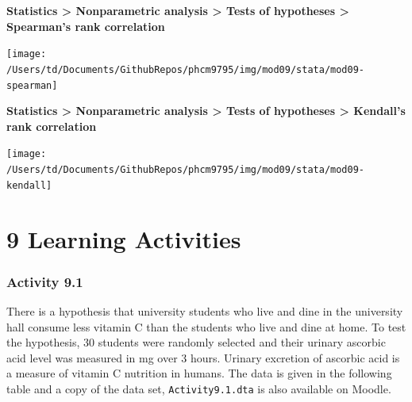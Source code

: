 \documentclass[
]{memoir}
\begin{document}
\textbf{Statistics \textgreater{} Nonparametric analysis \textgreater{} Tests of hypotheses \textgreater{} Spearman's rank correlation}

\texttt{[image: /Users/td/Documents/GithubRepos/phcm9795/img/mod09/stata/mod09-spearman]}

\textbf{Statistics \textgreater{} Nonparametric analysis \textgreater{} Tests of hypotheses \textgreater{} Kendall's rank correlation}

\texttt{[image: /Users/td/Documents/GithubRepos/phcm9795/img/mod09/stata/mod09-kendall]}

\hypertarget{learning-activities-8}{%
\chapter*{\texorpdfstring{\textbf{9} Learning Activities}{9 Learning Activities}}\label{learning-activities-8}}

\hypertarget{activity-9.1}{%
\subsection*{Activity 9.1}\label{activity-9.1}}

There is a hypothesis that university students who live and dine in the university hall consume less vitamin C than the students who live and dine at home. To test the hypothesis, 30 students were randomly selected and their urinary ascorbic acid level was measured in mg over 3 hours. Urinary excretion of ascorbic acid is a measure of vitamin C nutrition in humans. The data is given in the following table and a copy of the data set, \texttt{Activity9.1.dta} is also available on Moodle.

 
  \providecommand{\huxb}[2]{\arrayrulecolor[RGB]{#1}\global\arrayrulewidth=#2pt}
  \providecommand{\huxvb}[2]{\color[RGB]{#1}\vrule width #2pt}
  \providecommand{\huxtpad}[1]{\rule{0pt}{#1}}
  \providecommand{\huxbpad}[1]{\rule[-#1]{0pt}{#1}}
\end{document}

